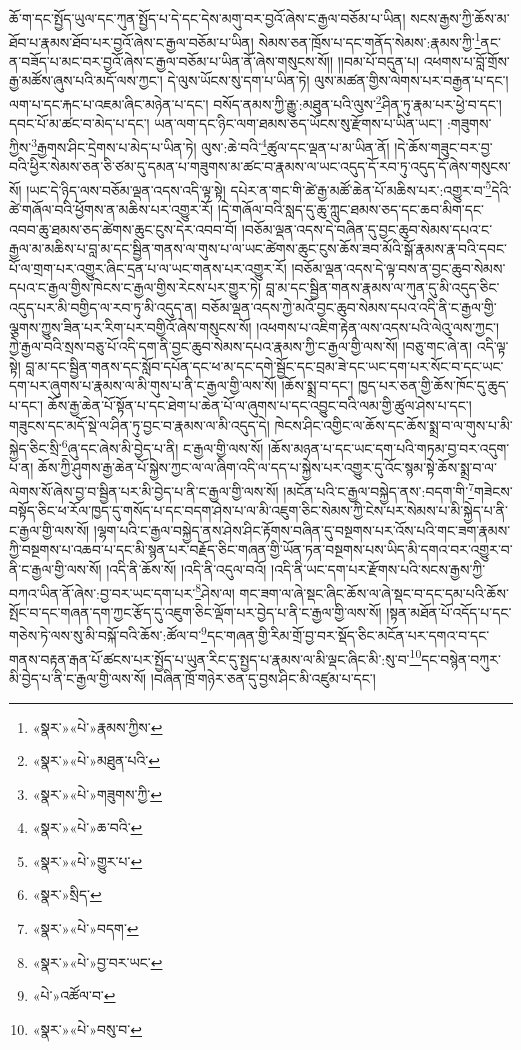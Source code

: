 ཆོ་ག་དང་སྤྱོད་ཡུལ་དང་ཀུན་སྤྱོད་པ་དེ་དང་དེས་མགུ་བར་བྱའོ་ཞེས་ང་རྒྱལ་བཅོམ་པ་ཡིན། སངས་རྒྱས་ཀྱི་ཆོས་མ་ཐོབ་པ་རྣམས་ཐོབ་པར་བྱའོ་ཞེས་ང་རྒྱལ་བཅོམ་པ་ཡིན། སེམས་ཅན་ཁྲོས་པ་དང་གནོད་སེམས་:རྣམས་ཀྱི་\footnote{«སྣར་»«པེ་»རྣམས་ཀྱིས་}ནང་ན་བཟོད་པ་མང་བར་བྱའོ་ཞེས་ང་རྒྱལ་བཅོམ་པ་ཡིན་ནོ་ཞེས་གསུངས་སོ།། །།བམ་པོ་བདུན་པ། འཕགས་པ་བློ་གྲོས་རྒྱ་མཚོས་ཞུས་པའི་མདོ་ལས་ཀྱང་། དེ་ལུས་ཡོངས་སུ་དག་པ་ཡིན་ཏེ། ལུས་མཚན་གྱིས་ལེགས་པར་བརྒྱན་པ་དང་། ལག་པ་དང་རྐང་པ་འཇམ་ཞིང་མཉེན་པ་དང་། བསོད་ནམས་ཀྱི་རྒྱུ་:མཐུན་པའི་ལུས་\footnote{«སྣར་»«པེ་»མཐུན་པའི་}ཤིན་ཏུ་རྣམ་པར་ཕྱེ་བ་དང་། དབང་པོ་མ་ཚང་བ་མེད་པ་དང་། ཡན་ལག་དང་ཉིང་ལག་ཐམས་ཅད་ཡོངས་སུ་རྫོགས་པ་ཡིན་ཡང་། :གཟུགས་ཀྱིས་\footnote{«སྣར་»«པེ་»གཟུགས་ཀྱི་}རྒྱགས་ཤིང་དྲེགས་པ་མེད་པ་ཡིན་ཏེ། ལུས་:ཆེ་བའི་\footnote{«སྣར་»«པེ་»ཆ་བའི་}ཚུལ་དང་ལྡན་པ་མ་ཡིན་ནོ། །དེ་ཆོས་གཟུང་བར་བྱ་བའི་ཕྱིར་སེམས་ཅན་ཅི་ཙམ་དུ་དམན་པ་གཟུགས་མ་ཚང་བ་རྣམས་ལ་ཡང་འདུད་དོ་རབ་ཏུ་འདུད་དོ་ཞེས་གསུངས་སོ། །ཡང་དེ་ཉིད་ལས་བཅོམ་ལྡན་འདས་འདི་ལྟ་སྟེ། དཔེར་ན་གང་གི་ཚེ་རྒྱ་མཚོ་ཆེན་པོ་མཆིས་པར་:འགྱུར་བ་\footnote{«སྣར་»«པེ་»གྱུར་པ་}དེའི་ཚེ་གཞོལ་བའི་ཕྱོགས་ན་མཆིས་པར་འགྱུར་རོ། །དེ་གཞོལ་བའི་སླད་དུ་ཆུ་ཀླུང་ཐམས་ཅད་དང་ཆབ་མིག་དང་འབབ་ཆུ་ཐམས་ཅད་ཚེགས་ཆུང་ངུས་དེར་འབབ་བོ། །བཅོམ་ལྡན་འདས་དེ་བཞིན་དུ་བྱང་ཆུབ་སེམས་དཔའ་ང་རྒྱལ་མ་མཆིས་པ་བླ་མ་དང་སྦྱིན་གནས་ལ་གུས་པ་ལ་ཡང་ཚེགས་ཆུང་ངུས་ཆོས་ཟབ་མོའི་སྒོ་རྣམས་རྣ་བའི་དབང་པོ་ལ་གྲག་པར་འགྱུར་ཞིང་དྲན་པ་ལ་ཡང་གནས་པར་འགྱུར་རོ། །བཅོམ་ལྡན་འདས་དེ་ལྟ་བས་ན་བྱང་ཆུབ་སེམས་དཔའ་ང་རྒྱལ་གྱིས་ཁེངས་ང་རྒྱལ་གྱིས་རེངས་པར་གྱུར་ཏེ། བླ་མ་དང་སྦྱིན་གནས་རྣམས་ལ་ཀུན་དུ་མི་འདུད་ཅིང་འདུད་པར་མི་བགྱིད་ལ་རབ་ཏུ་མི་འདུད་ན། བཅོམ་ལྡན་འདས་ཀྱེ་མའོ་བྱང་ཆུབ་སེམས་དཔའ་འདི་ནི་ང་རྒྱལ་གྱི་ལྕགས་ཀྱུས་ཟིན་པར་རིག་པར་བགྱིའོ་ཞེས་གསུངས་སོ། །འཕགས་པ་འཇིག་རྟེན་ལས་འདས་པའི་ལེའུ་ལས་ཀྱང་། ཀྱེ་རྒྱལ་བའི་སྲས་བཅུ་པོ་འདི་དག་ནི་བྱང་ཆུབ་སེམས་དཔའ་རྣམས་ཀྱི་ང་རྒྱལ་གྱི་ལས་སོ། །བཅུ་གང་ཞེ་ན། འདི་ལྟ་སྟེ། བླ་མ་དང་སྦྱིན་གནས་དང་སློབ་དཔོན་དང་ཕ་མ་དང་དགེ་སྦྱོང་དང་བྲམ་ཟེ་དང་ཡང་དག་པར་སོང་བ་དང་ཡང་དག་པར་ཞུགས་པ་རྣམས་ལ་མི་གུས་པ་ནི་ང་རྒྱལ་གྱི་ལས་སོ། །ཆོས་སྨྲ་བ་དང་། ཁྱད་པར་ཅན་གྱི་ཆོས་ཁོང་དུ་ཆུད་པ་དང་། ཆོས་རྒྱ་ཆེན་པོ་སྟོན་པ་དང་ཐེག་པ་ཆེན་པོ་ལ་ཞུགས་པ་དང་འབྱུང་བའི་ལམ་གྱི་ཚུལ་ཤེས་པ་དང་། གཟུངས་དང་མདོ་སྡེ་ལ་ཤིན་ཏུ་བྱང་བ་རྣམས་ལ་མི་འདུད་དེ། ཁེངས་ཤིང་འགྱིང་ལ་ཆོས་དང་ཆོས་སྨྲ་བ་ལ་གུས་པ་མི་སྐྱེད་ཅིང་སྲི་\footnote{«སྣར་»སྲིད་}ཞུ་དང་ཞེས་མི་བྱེད་པ་ནི། ང་རྒྱལ་གྱི་ལས་སོ། །ཆོས་མཉན་པ་དང་ཡང་དག་པའི་གཏམ་བྱ་བར་འདུག་པ་ན། ཆོས་ཀྱི་ཤུགས་རྒྱ་ཆེན་པོ་སྐྱེས་ཀྱང་ལ་ལ་ཞིག་འདི་ལ་དད་པ་སྐྱེས་པར་འགྱུར་དུ་འོང་སྙམ་སྟེ་ཆོས་སྨྲ་བ་ལ་ལེགས་སོ་ཞེས་བྱ་བ་སྦྱིན་པར་མི་བྱེད་པ་ནི་ང་རྒྱལ་གྱི་ལས་སོ། །མངོན་པའི་ང་རྒྱལ་བསྐྱེད་ནས་:བདག་གི་\footnote{«སྣར་»«པེ་»བདག་}གཟེངས་བསྟོད་ཅིང་ཕ་རོལ་ཁྱད་དུ་གསོད་པ་དང་བདག་ཤེས་པ་ལ་མི་འཇུག་ཅིང་སེམས་ཀྱི་ངེས་པར་སེམས་པ་མི་སྐྱེད་པ་ནི་ང་རྒྱལ་གྱི་ལས་སོ། །ལྷག་པའི་ང་རྒྱལ་བསྐྱེད་ནས་ཤེས་ཤིང་རྟོགས་བཞིན་དུ་བསྔགས་པར་འོས་པའི་གང་ཟག་རྣམས་ཀྱི་བསྔགས་པ་འཆབ་པ་དང་མི་སྙན་པར་བརྗོད་ཅིང་གཞན་གྱི་ཡོན་ཏན་བསྔགས་པས་ཡིད་མི་དགའ་བར་འགྱུར་བ་ནི་ང་རྒྱལ་གྱི་ལས་སོ། །འདི་ནི་ཆོས་སོ། །འདི་ནི་འདུལ་བའོ། །འདི་ནི་ཡང་དག་པར་རྫོགས་པའི་སངས་རྒྱས་ཀྱི་བཀའ་ཡིན་ནོ་ཞེས་:བྱ་བར་ཡང་དག་པར་\footnote{«སྣར་»«པེ་»བྱ་བར་ཡང་}ཤེས་ལ། གང་ཟག་ལ་ཞེ་སྡང་ཞིང་ཆོས་ལ་ཞེ་སྡང་བ་དང་དམ་པའི་ཆོས་སྤོང་བ་དང་གཞན་དག་ཀྱང་རྩོད་དུ་འཇུག་ཅིང་ལྡོག་པར་བྱེད་པ་ནི་ང་རྒྱལ་གྱི་ལས་སོ། །སྟན་མཐོན་པོ་འདོད་པ་དང་གཅེས་ཏེ་ལས་སུ་མི་བསྐོ་བའི་ཆོས་:ཚོལ་བ་\footnote{«པེ་»འཚོལ་བ་}དང་གཞན་གྱི་རིམ་གྲོ་བྱ་བར་སྡོད་ཅིང་མངོན་པར་དགའ་བ་དང་གནས་བརྟན་རྒན་པོ་ཚངས་པར་སྤྱོད་པ་ཡུན་རིང་དུ་སྤྱད་པ་རྣམས་ལ་མི་ལྡང་ཞིང་མི་:སུ་བ་\footnote{«སྣར་»«པེ་»བསུ་བ་}དང་བསྙེན་བཀུར་མི་བྱེད་པ་ནི་ང་རྒྱལ་གྱི་ལས་སོ། །བཞིན་ཁྲོ་གཉེར་ཅན་དུ་བྱས་ཤིང་མི་འཛུམ་པ་དང་། 
